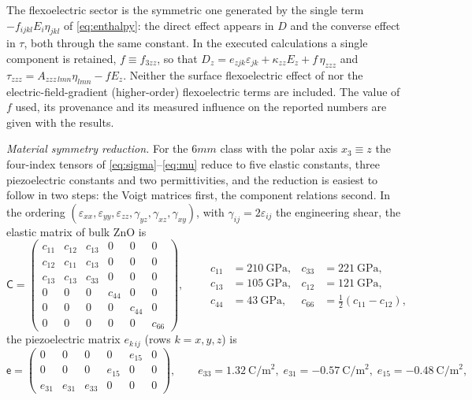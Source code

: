 The flexoelectric sector is the symmetric one generated by the single term
$-f_{ijkl}E_i\eta_{jkl}$ of \eqref{eq:enthalpy}: the direct effect appears in
$D$ and the converse effect in $\tau$, both through the same constant.  In the
executed calculations a single component is retained, $f\equiv f_{3zz}$, so
that $D_z=e_{zjk}\varepsilon_{jk}+\kappa_{zz}E_z+f\,\eta_{zzz}$ and
$\tau_{zzz}=A_{zzz\,lmn}\eta_{lmn}-f E_z$.  Neither the surface flexoelectric
effect of \cite{shen2010theory} nor the electric-field-gradient (higher-order)
flexoelectric terms are included.  The value of $f$ used, its provenance and
its measured influence on the reported numbers are given with the results.

\emph{Material symmetry reduction.}  For the $6mm$ class with the polar axis
$x_3\equiv z$ the four-index tensors of \eqref{eq:sigma}--\eqref{eq:mu} reduce
to five elastic constants, three piezoelectric constants and two permittivities,
and the reduction is easiest to follow in two steps: the Voigt matrices first,
the component relations second.  In the ordering
$(\varepsilon_{xx},\varepsilon_{yy},\varepsilon_{zz},\gamma_{yz},\gamma_{xz},
\gamma_{xy})$, with $\gamma_{ij}=2\varepsilon_{ij}$ the engineering shear, the
elastic matrix of bulk ZnO is
\begin{equation}
\label{eq:CZnO}
\mathsf C=
\begin{pmatrix}
c_{11}&c_{12}&c_{13}&0&0&0\\
c_{12}&c_{11}&c_{13}&0&0&0\\
c_{13}&c_{13}&c_{33}&0&0&0\\
0&0&0&c_{44}&0&0\\
0&0&0&0&c_{44}&0\\
0&0&0&0&0&c_{66}
\end{pmatrix},
\qquad
\begin{aligned}
c_{11}&=\SI{210}{\giga\pascal},& c_{33}&=\SI{221}{\giga\pascal},\\
c_{13}&=\SI{105}{\giga\pascal},& c_{12}&=\SI{121}{\giga\pascal},\\
c_{44}&=\SI{43}{\giga\pascal},& c_{66}&=\tfrac12(c_{11}-c_{12}),
\end{aligned}
\end{equation}
the piezoelectric matrix $e_{k\,ij}$ (rows $k=x,y,z$) is
\begin{equation}
\label{eq:ZnOe}
\mathsf e=
\begin{pmatrix}
0&0&0&0&e_{15}&0\\
0&0&0&e_{15}&0&0\\
e_{31}&e_{31}&e_{33}&0&0&0
\end{pmatrix},
\qquad
e_{33}=\SI{1.32}{\coulomb\per\square\metre},\;
e_{31}=\SI{-0.57}{\coulomb\per\square\metre},\;
e_{15}=\SI{-0.48}{\coulomb\per\square\metre},
\end{equation}
